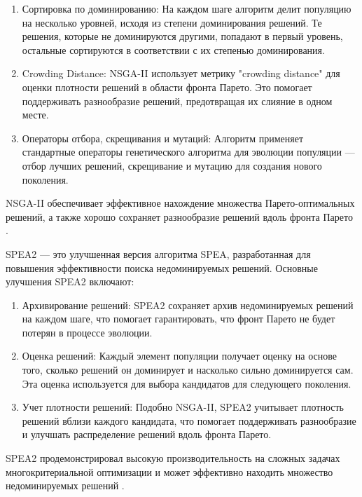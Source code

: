\begin{enumerate}
    \item Сортировка по доминированию: На каждом шаге алгоритм делит популяцию на несколько уровней,
    исходя из степени доминирования решений. Те решения, которые не доминируются другими, попадают в
    первый уровень, остальные сортируются в соответствии с их степенью доминирования.

    \item Crowding Distance: NSGA-II использует метрику "crowding distance" для оценки плотности
    решений в области фронта Парето. Это помогает поддерживать разнообразие решений, предотвращая
    их слияние в одном месте.

    \item Операторы отбора, скрещивания и мутаций: Алгоритм применяет стандартные операторы
    генетического алгоритма для эволюции популяции — отбор лучших решений, скрещивание и мутацию
    для создания нового поколения.
\end{enumerate}

NSGA-II обеспечивает эффективное нахождение множества Парето-оптимальных решений,
а также хорошо сохраняет разнообразие решений вдоль фронта Парето \cite*{deb2001multi}.

SPEA2 — это улучшенная версия алгоритма SPEA, разработанная для повышения эффективности поиска недоминируемых решений. Основные улучшения SPEA2 включают:

\begin{enumerate}
    \item Архивирование решений: SPEA2 сохраняет архив недоминируемых решений на каждом шаге, что помогает гарантировать,
    что фронт Парето не будет потерян в процессе эволюции.

    \item Оценка решений: Каждый элемент популяции получает оценку на основе того,
    сколько решений он доминирует и насколько сильно доминируется сам. Эта оценка
    используется для выбора кандидатов для следующего поколения.

    \item Учет плотности решений: Подобно NSGA-II, SPEA2 учитывает плотность решений
    вблизи каждого кандидата, что помогает поддерживать разнообразие и улучшать
    распределение решений вдоль фронта Парето.
\end{enumerate}

SPEA2 продемонстрировал высокую производительность на сложных задачах многокритериальной
оптимизации и может эффективно находить множество недоминируемых решений \cite{zitzler2001spea2}.

